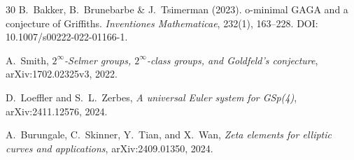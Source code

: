 \documentclass[aps,prd,twocolumn,superscriptaddress,nofootinbib]{revtex4-2}
\theoremstyle{definition}
\theoremstyle{remark}
\begin{document}
\begin{thebibliography}{30}
B.~Bakker, B.~Brunebarbe \& J.~Tsimerman (2023).
o-minimal GAGA and a conjecture of Griffiths.
\textit{Inventiones Mathematicae}, 232(1), 163--228.
DOI: 10.1007/s00222-022-01166-1.

A.~Smith, \textit{$2^\infty$-Selmer groups, $2^\infty$-class groups, and Goldfeld's conjecture}, arXiv:1702.02325v3, 2022.

 D.~Loeffler and S.~L.~Zerbes, \textit{A universal Euler system for GSp(4)}, arXiv:2411.12576, 2024.

 A.~Burungale, C.~Skinner, Y.~Tian, and X.~Wan, \textit{Zeta elements for elliptic curves and applications}, arXiv:2409.01350, 2024.

\end{thebibliography}
\end{document}
